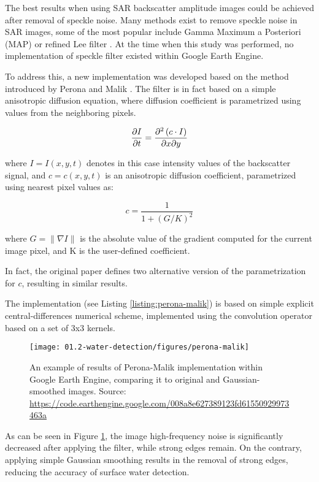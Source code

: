 The best results when using SAR backscatter amplitude images could be achieved after removal of speckle noise. Many methods exist to remove speckle noise in SAR images, some of the most popular include Gamma Maximum a Posteriori (MAP) \citet{lopes1990maximum} or refined Lee filter \citet{lee1981speckle}. At the time when this study was performed, no implementation of speckle filter existed within Google Earth Engine. 

To address this, a new implementation was developed based on the method introduced by Perona and Malik \citet{perona1990scale}. The filter is in fact based on a simple anisotropic diffusion equation, where diffusion coefficient is parametrized using values from the neighboring pixels. 

\begin{equation}
\pdv{I}{t} = \pdv[2]{ \left(c \cdot I\right)}{x}{y}
\end{equation}

where $I=I(x,y,t)$ denotes in this case intensity values of the backscatter signal, and $c=c(x,y,t)$ is an anisotropic diffusion coefficient, parametrized using nearest pixel values as:

\begin{equation}
c = \frac{1}{1 + \left(G/K\right)^2}
\end{equation}

where $G = \| \nabla I\|$ is the absolute value of the gradient computed for the current image pixel, and K is the user-defined coefficient.

In fact, the original paper defines two alternative version of the parametrization for $c$, resulting in similar results.


The implementation (see Listing \ref{listing:perona-malik}) is based on simple explicit central-differences numerical scheme, implemented using the convolution operator based on a set of 3x3 kernels. 

\begin{figure}[H]
	\texttt{[image: 01.2-water-detection/figures/perona-malik]}
	\caption{An example of results of Perona-Malik implementation within Google Earth Engine, comparing it to original and Gaussian-smoothed images. Source: \url{https://code.earthengine.google.com/008a8e627389123fd61550929973463a}}
	\label{fig:perona-malik}
\end{figure}

As can be seen in Figure \ref{fig:perona-malik}, the image high-frequency noise is significantly decreased after applying the filter, while strong edges remain. On the contrary, applying simple Gaussian smoothing results in the removal of strong edges, reducing the accuracy of surface water detection.

